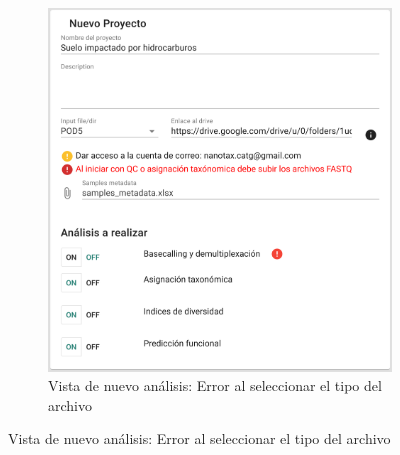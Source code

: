 \begin{itemize}
\begin{figure}[H]
\begin{subfigure}[b]{0.45\textwidth}
        \includegraphics[width=\textwidth]{images/app/newAnalysis/fastq.png}
        \caption{Vista de nuevo análisis: Error al seleccionar el tipo del archivo}
        \label{fig:app-new-analysis-fastq-error}
    \end{subfigure}
    \caption{Vista de nuevo análisis: Error al seleccionar el tipo del archivo}
    \label{fig:app-new-analysis-type-file-error}
\end{figure}




\end{itemize}
